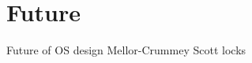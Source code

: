 \section[Future]{Future}
\begin{frame}{Future of OS design}
  Mellor-Crummey Scott locks
\end{frame}

